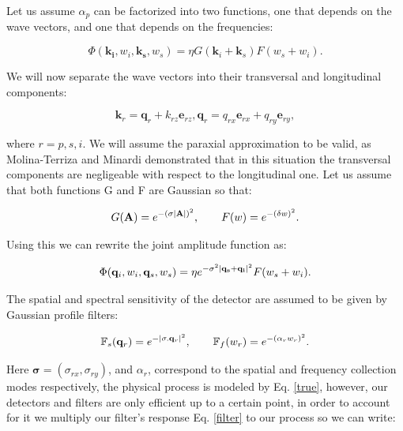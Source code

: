 \documentclass{book}
\begin{document}
Let us assume  $\alpha_{p}$ can be factorized into two functions, one that depends on the wave vectors, and one that depends on the frequencies:

\begin{equation}
\Phi(\mathbf{k_{i}},w_{i},\mathbf{k_{s}},w_{s})= \eta G(\mathbf{k}_{i}+\mathbf{k}_{s}) F(w_{s}+w_{i}) .
\end{equation}
 
We  will now separate the wave vectors into their transversal and longitudinal components:

\begin{equation}
\mathbf{k}_{r}=\mathbf{q}_{r}+k_{rz} \mathbf{e}_{rz},\mathbf{q}_{r}=q_{rx} \mathbf{e}_{rx}+q_{ry} \mathbf{e}_{ry},
\end{equation}

where $r=p,s,i$. We will assume the paraxial approximation to be valid,  as Molina-Terriza and Minardi \cite{minardi} demonstrated that in this situation the transversal components are negligeable with respect to the longitudinal one. Let us assume that both functions G and F are Gaussian so that:

\begin{equation}
G(\mathbf{A})=e^{- (\sigma \abs{\mathbf{A}})^{2} },\qquad F(w)=e^{-(\delta w)^2}.
\end{equation}

Using this we can rewrite the joint amplitude function as:

\begin{equation}
\Phi(\mathbf{q}_{i},w_{i},\mathbf{q}_{s},w_{s})= \eta e^{-\sigma^{2}\abs{\mathbf{q_{s}}+\mathbf{q_{i}}}^{2}} F(w_{s}+w_{i}).\label{true}
\end{equation}

The spatial and spectral sensitivity of the detector are assumed to be given by Gaussian profile filters:

\begin{equation}
\mathbb{F}_{s}(\mathbf{q}_{r})=e^{-\abs{\mathbf{\sigma}.\mathbf{q}_{r}}^{2}},\qquad \mathbb{F}_{f}(w_{r})=e^{-(\alpha_{r} w_{r})^{2}}. \label{filter}
\end{equation}

Here $\mathbf{\sigma}=(\sigma_{rx},\sigma_{ry})$, and $\alpha_{r}$, correspond to the spatial and frequency collection modes respectively, the physical process is modeled by Eq. \ref{true}, however, our detectors and filters are only efficient up to a certain point, in order to account for it we multiply our filter's response Eq. \ref{filter} to our process so we can write:
 
\end{document}
